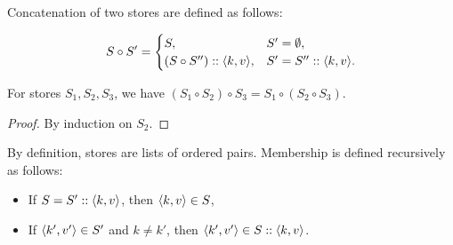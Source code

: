 





\begin{definition}
Concatenation of two stores are defined as follows:

\begin{equation*}
S \circ S' =
\begin{cases}
    S, & S' = \emptyset, \\
    (S \circ S'') :: \langle k, v \rangle, & S' = S'' :: \langle k, v \rangle.
\end{cases}
\end{equation*}
\end{definition}

\begin{lemma}[Associativity]
For stores $S_1, S_2, S_3$, we have $(S_1 \circ S_2) \circ S_3 = S_1 \circ (S_2 \circ S_3)$.
\end{lemma}
\begin{proof}
By induction on $S_2$.
\end{proof}

\begin{definition}[Membership]
\label{defn:generic-context-membership}
By definition, stores are lists of ordered pairs. Membership is defined recursively as follows:
\begin{itemize}
    \item If $S = S' :: \langle k, v \rangle$, then $\langle k, v \rangle \in S$,
    \item If $\langle k', v' \rangle \in S'$ and $k \not= k'$, then $\langle k', v' \rangle \in S :: \langle k, v \rangle$. \qedhere
\end{itemize}
\end{definition}

